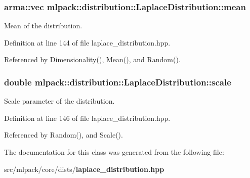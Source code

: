 \subsubsection[{mean}]{\setlength{\rightskip}{0pt plus 5cm}arma\-::vec mlpack\-::distribution\-::\-Laplace\-Distribution\-::mean\hspace{0.3cm}{\ttfamily [private]}}\label{classmlpack_1_1distribution_1_1LaplaceDistribution_a3e7efd65f6eb1cd156ba1b1562773b4b}


Mean of the distribution. 



Definition at line 144 of file laplace\-\_\-distribution.\-hpp.



Referenced by Dimensionality(), Mean(), and Random().

\subsubsection[{scale}]{\setlength{\rightskip}{0pt plus 5cm}double mlpack\-::distribution\-::\-Laplace\-Distribution\-::scale\hspace{0.3cm}{\ttfamily [private]}}\label{classmlpack_1_1distribution_1_1LaplaceDistribution_a8bbf1dcc34d9b5cebd1bc364f7d2cb65}


Scale parameter of the distribution. 



Definition at line 146 of file laplace\-\_\-distribution.\-hpp.



Referenced by Random(), and Scale().



The documentation for this class was generated from the following file\-:\begin{DoxyCompactItemize}
\item 
src/mlpack/core/dists/{\bf laplace\-\_\-distribution.\-hpp}\end{DoxyCompactItemize}
